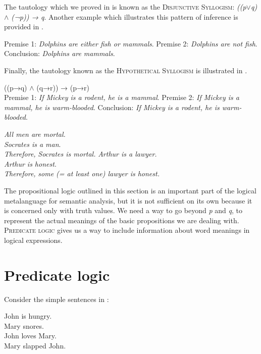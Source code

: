 The tautology which we proved in  is known as the \textsc{Disjunctive Syllogism}: \textit{((p$\vee$q) $\wedge$ (¬p)) → q}. Another example which illustrates this pattern of inference is provided in .


\ea \label{ex:4.19}
Premise 1: \textit{Dolphins are either fish or mammals}.  
Premise 2: \textit{Dolphins are not fish}.  
\FelixHRule
Conclusion: \textit{Dolphins are mammals}.   
\z


Finally, the tautology known as the \textsc{Hypothetical} \textsc{Syllogism} is illustrated in .


\ea \label{ex:4.20}
((p→q) $\wedge$ (q→r)) → (p→r)\\
Premise 1: \textit{If Mickey is a rodent, he is a mammal}.  
Premise 2: \textit{If Mickey is a mammal, he is warm-blooded}.  
\FelixHRule
Conclusion: \textit{If Mickey is a rodent, he is warm-blooded}.  
\z

\ea \label{ex:4.21}
\ea \textit{All men are mortal.}\\
\textit{Socrates is a man}.\\
\FelixHRule
\textit{Therefore,} \textit{Socrates is mortal.}
\ex \textit{Arthur is a lawyer.}\\
\textit{Arthur is honest}.\\
\FelixHRule
\textit{Therefore,} \textit{some (= at least one) lawyer is honest.}
\z \z

The propositional logic outlined in this section is an important part of the logical metalanguage for semantic analysis, but it is not sufficient on its own because it is concerned only with truth values. We need a way to go beyond \textit{p} and \textit{q}, to represent the actual meanings of the basic propositions we are dealing with. \textsc{Predicate logic} gives us a way to include information about word meanings in logical expressions.


\section{Predicate logic}\label{sec:4.4}

Consider the simple sentences in :


\ea \label{ex:4.22}
\ea John is hungry.\\
\ex Mary snores.\\
\ex John loves Mary.\\
\ex Mary slapped John.
                       \z
\z


